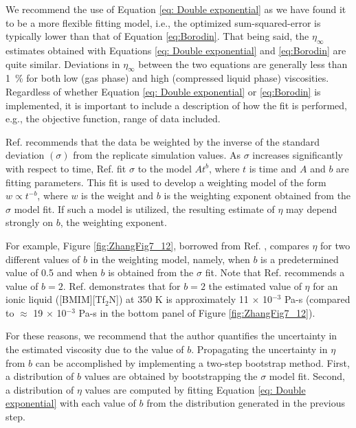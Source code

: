 \documentclass[9pt,bestpractices]{livecoms}
\begin{document}
We recommend the use of Equation \ref{eq: Double exponential} as we have found it to be a more flexible fitting model, i.e., the optimized sum-squared-error is typically lower than that of Equation \ref{eq:Borodin}. That being said, the $\eta_{\infty}$ estimates obtained with Equations \ref{eq: Double exponential} and \ref{eq:Borodin} are quite similar. Deviations in $\eta_{\infty}$ between the two equations are generally less than 1~\% for both low (gas phase) and high (compressed liquid phase) viscosities. Regardless of whether Equation \ref{eq: Double exponential} or \ref{eq:Borodin} is implemented, it is important to include a description of how the fit is performed, e.g., the objective function, range of data included.

Ref. \cite{Zhang2015} recommends that the data be weighted by the inverse of the standard deviation $(\sigma)$ from the replicate simulation values. As $\sigma$ increases significantly with respect to time, Ref. \cite{Zhang2015} fit $\sigma$ to the model $A t^b$, where $t$ is time and $A$ and $b$ are fitting parameters. This fit is used to develop a weighting model of the form $w \propto t^{-b}$, where $w$ is the weight and $b$ is the weighting exponent obtained from the $\sigma$ model fit. If such a model is utilized, the resulting estimate of $\eta$ may depend strongly on $b$, the weighting exponent. 

For example, Figure \ref{fig:ZhangFig7_12}, borrowed from Ref. \cite{Zhang2015}, compares $\eta$ for two different values of $b$ in the weighting model, namely, when $b$ is a predetermined value of 0.5 and when $b$ is obtained from the $\sigma$ fit. Note that Ref. \cite{ReyCastro2006} recommends a value of $b=2$. Ref. \cite{Zhang2015} demonstrates that for $b=2$ the estimated value of $\eta$ for an ionic liquid ([BMIM][Tf$_2$N]) at 350 K is approximately 11 $\times$ 10$^{-3}$ Pa-s (compared to $\approx$ 19 $\times$ 10$^{-3}$ Pa-s in the bottom panel of Figure \ref{fig:ZhangFig7_12}). 

For these reasons, we recommend that the author quantifies the uncertainty in the estimated viscosity due to the value of $b$. Propagating the uncertainty in $\eta$ from $b$ can be accomplished by implementing a two-step bootstrap method. First, a distribution of $b$ values are obtained by bootstrapping the $\sigma$ model fit. Second, a distribution of $\eta$ values are computed by fitting Equation \ref{eq: Double exponential} with each value of $b$ from the distribution generated in the previous step.
\end{document}
